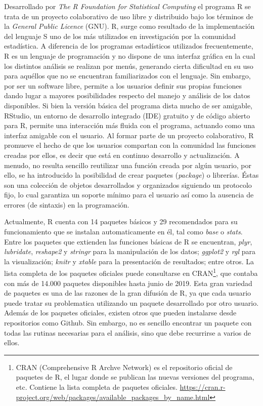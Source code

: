 Desarrollado por \emph{The R Foundation for Statistical Computing} el programa R se trata de un proyecto colaborativo de uso libre y distribuido bajo los términos de la \emph{General Public Licence} (GNU). R, surge como resultado de la implementación del lenguaje S uno de los más utilizados en investigación por la comunidad estadística. A diferencia de los programas estadísticos utilizados frecuentemente, R es un lenguaje de programación y no dispone de una interfaz gráfica en la cual los distintos análisis se realizan por menús, generando cierta dificultad en su uso para aquéllos que no se encuentran familiarizados con el lenguaje. Sin embargo,  por ser un software  libre,  permite a los usuarios definir sus propias funciones dando lugar a mayores posibilidades respecto del manejo y análisis de los datos disponibles. Si bien la versión básica del programa dista mucho de ser amigable, RStudio, un entorno de desarrollo integrado (IDE) gratuito y de código abierto para R, permite una interacción más fluida con el programa, actuando como una interfaz amigable con el usuario.  Al formar parte de un proyecto colaborativo, R promueve el hecho de que los usuarios compartan con la comunidad las funciones creadas por ellos, es decir que está en continuo desarrollo y actualización. A menudo, no resulta sencillo reutilizar una función creada por algún usuario, por ello, se ha introducido la posibilidad de crear paquetes (\emph{package}) o librerías. Éstas son una colección de objetos desarrollados y organizados siguiendo un protocolo fijo, lo cual garantiza un soporte mínimo para el usuario así como la ausencia de errores (de sintaxis) en la programación.

Actualmente, R cuenta con 14 paquetes básicos y 29 recomendados para su funcionamiento que se instalan automaticamente en él, tal como \emph{base} o \emph{stats}. Entre los paquetes que extienden las funciones básicas de R se encuentran, \emph{plyr}, \emph{lubridate}, \emph{reshape2} y \emph{stringr} para la manipulación de los datos; \emph{ggplot2} y \emph{rgl} para la visualización; \emph{knitr} y \emph{xtable} para la presentación de resultados; entre otros. La lista completa de los paquetes oficiales puede consultarse en CRAN\footnote{CRAN (Comprehensive R Archve Network) es el repositorio oficial de paquetes de R, el lugar donde se publican las nuevas versiones del programa, etc. Contiene la lista completa de paquetes oficiales. \url{https://cran.r-project.org/web/packages/available_packages_by_name.html}}, que contaba con más de 14.000 paquetes disponibles hasta junio de 2019. Esta gran variedad de paquetes es una de las razones de la gran difusión de R, ya que cada usuario puede tratar su problematica utilizando un paquete desarrollado por otro usuario. Además de los paquetes oficiales, existen otros que pueden instalarse desde repositorios como Github. Sin embargo, no es sencillo encontrar un paquete con todas las rutinas necesarias para el análisis, sino que debe recurrirse a varios de ellos. 

